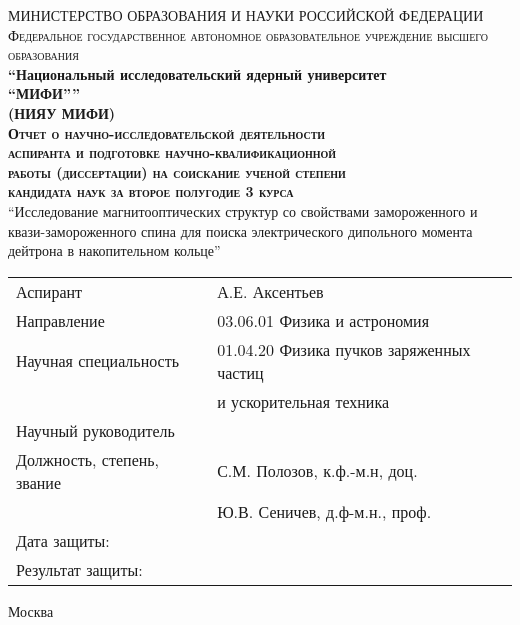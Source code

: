 \begin{titlepage}

\begin{center}
{МИНИСТЕРСТВО ОБРАЗОВАНИЯ И НАУКИ РОССИЙСКОЙ ФЕДЕРАЦИИ}\\[3pt]
\textsc{\small{Федеральное государственное автономное образовательное учреждение высшего образования}}\\

\textbf{\enquote{Национальный исследовательский ядерный университет\\
{``МИФИ''}}}\\
\textbf{(НИЯУ МИФИ)}\\[2cm]




\textsc{\textbf{Отчет о научно-исследовательской деятельности\\		
		аспиранта и подготовке научно-квалификационной\\	
		работы (диссертации) на соискание ученой степени\\		
		кандидата наук за второе полугодие 3 курса}}\\[2cm]

\enquote{Исследование магнитооптических структур со свойствами замороженного и квази-замороженного спина для поиска электрического дипольного момента дейтрона в накопительном кольце}\\[2cm]


\end{center}


\begin{flushleft}
\begin{tabular}{ll}
	Аспирант                   & А.Е. Аксентьев                           \\
	Направление                & 03.06.01 Физика и астрономия             \\
	Научная специальность      & 01.04.20 Физика пучков заряженных частиц \\
	                           & \-\hspace{1.8cm} и ускорительная техника \\[1cm]
	Научный руководитель       &                                          \\
	Должность, степень, звание & С.М. Полозов, к.ф.-м.н, доц.             \\%
	                           & Ю.В. Сеничев, д.ф-м.н., проф.            \\[1cm]
	Дата защиты:               &                                          \\
	Результат защиты:          &
\end{tabular}

\end{flushleft}

\vfill


\begin{center}
Москва \the\year{}
\end{center}



\end{titlepage}